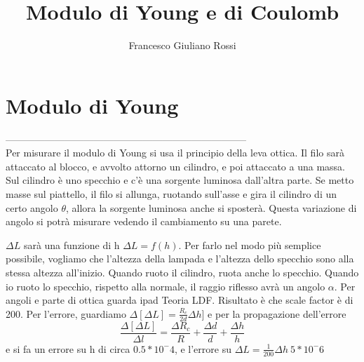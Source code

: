 \documentclass[a4paper]{article}
\title{Modulo di Young e di Coulomb}
\author{Francesco Giuliano Rossi}
\date{}
\begin{document}
\maketitle
\tableofcontents

\section{Modulo di Young}
-------------------------------------------------------------------------- \\
 Per misurare il modulo di Young si usa il principio della leva ottica. Il filo sarà attaccato al blocco, e avvolto attorno un cilindro, e poi attaccato a una massa. Sul cilindro è uno specchio e c'è una sorgente luminosa dall'altra parte. Se metto masse sul piattello, il filo si allunga, ruotando sull'asse e gira il cilindro di un certo angolo $\theta$, allora la sorgente luminosa anche si sposterà. Questa variazione di angolo si potrà misurare vedendo il cambiamento su una parete. 

$\Delta L$ sarà una funzione di h $\Delta L = f(h)$. Per farlo nel modo più semplice possibile, vogliamo che l'altezza della lampada e l'altezza dello specchio sono alla stessa altezza all'inizio. Quando ruoto il cilindro, ruota anche lo specchio. 
Quando io ruoto lo specchio, rispetto alla normale, il raggio riflesso avrà un angolo $\alpha$. 
Per angoli e parte di ottica guarda ipad Teoria LDF. Risultato è che scale factor è di 200. Per l'errore, guardiamo $\Delta[\Delta L] = \frac{R_c}{2d} \Delta h]$ e per la propagazione dell'errore 
\begin{equation*}
    \frac{\Delta [\Delta L]}{\Delta l} = \frac{\Delta R_c}{R} + \frac{\Delta d}{d} + \frac{\Delta h}{h}
\end{equation*}
e si fa un errore su h di circa $0.5*10^-4$, e l'errore su $\Delta L = \frac{1}{200} \Delta h ~ 5*10^-6$ 
\end{document}
